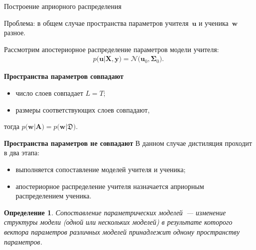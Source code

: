 \documentclass[10pt,pdf,hyperref={unicode}]{beamer}
\newtheorem{rusdefinition}{Определение}
\begin{document}
\begin{frame}{Построение априорного распределения}

Проблема: в общем случае пространства параметров учителя~$\mathbf{u}$ и ученика~$\mathbf{w}$ разное.

Рассмотрим апостериорное распределение параметров модели учителя:
\[
\begin{aligned}
p\bigr(\mathbf{u}|\mathbf{X}, \mathbf{y}\bigr) = \mathcal{N}\bigr(\mathbf{u}_0, \bm{\Sigma}_0\bigr).
\end{aligned}
\]

\textbf{Пространства параметров совпадают}
\begin{itemize}
    \item число слоев совпадает $L=T$;
    \item размеры соответствующих слоев совпадают,
\end{itemize}
тогда $p\bigr(\mathbf{w}|\mathbf{A}\bigr) = p\bigr(\mathbf{w}|\mathfrak{D}\bigr)$.

\textbf{Пространства параметров не совпадают}
В данном случае дистиляция проходит в два этапа:
\begin{itemize}
    \item выполняется сопоставление моделей учителя и ученика;
    \item апостериорное распределение учителя назначается априорным распределением ученика.
\end{itemize}

\begin{rusdefinition}
Сопоставление параметрических моделей~--- изменение структуры модели (одной или нескольких моделей) в результате которого вектора параметров различных моделей принадлежит одному пространству параметров.
\end{rusdefinition}

\end{frame}
\end{document}

